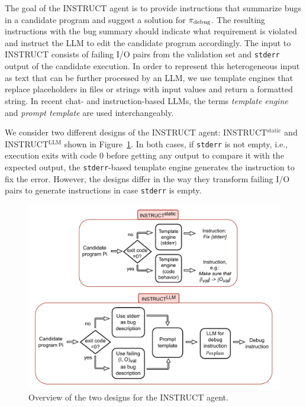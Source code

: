 The goal of the INSTRUCT agent is to provide instructions that summarize bugs in a candidate program and suggest a solution for $ \pi_\text{debug} $. 
The resulting instructions with the bug summary should indicate what requirement is violated and instruct the LLM to edit the candidate program accordingly. 
The input to INSTRUCT consists of failing I/O pairs from the validation set and \texttt{stderr} output of the candidate execution. 
In order to represent this heterogeneous input as text that can be further processed by an LLM, we use template engines that replace placeholders in files or strings with input values and return a formatted string. 
In recent chat- and instruction-based LLMs, the terms \emph{template engine} and \emph{prompt template} are used interchangeably.

We consider two different designs of the INSTRUCT agent: INSTRUCT$^{\text{static}}$ and INSTRUCT$^{\text{LLM}}$ shown in Figure~\ref{fig:method-instruct}. 
In both cases, if \texttt{stderr} is not empty, i.e., execution exits with code 0 before getting any output to compare it with the expected output, the \texttt{stderr}-based template engine generates the instruction to fix the error. 
However, the designs differ in the way they transform failing I/O pairs to generate instructions in case \texttt{stderr} is empty.

\begin{figure}
    \centering
    \includegraphics[width=0.85\linewidth,trim={0mm 0mm 0mm 0mm}]{images/codex-for-psb-seidr-instruct-2.drawio.pdf}
    \caption{Overview of the two designs for the INSTRUCT agent.}
    \label{fig:method-instruct}
\end{figure}

